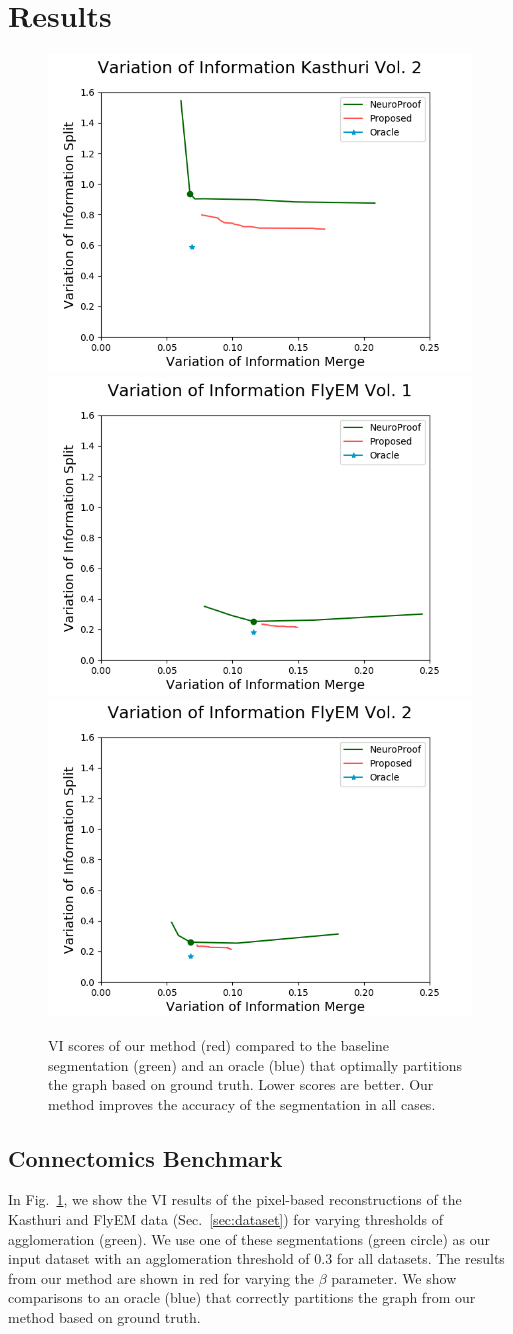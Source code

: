 \section{Results}

\begin{figure}[t!]
	\centering
	\includegraphics[width=0.32\linewidth]{./figures/variation_of_information-microns-test-600.png}
	\includegraphics[width=0.32\linewidth]{./figures/variation_of_information-FlyEM-train-600.png}
	\includegraphics[width=0.32\linewidth]{./figures/variation_of_information-FlyEM-test-600.png}
	\caption{VI scores of our method (red) compared to the baseline segmentation (green) and an oracle (blue) that optimally partitions the graph based on ground truth. Lower scores are better. Our method improves the accuracy of the segmentation in all cases.}
	\label{fig:variation-of-information}
\end{figure}

\subsection{Connectomics Benchmark}

In Fig.~\ref{fig:variation-of-information}, we show the VI results of the pixel-based reconstructions of the Kasthuri and FlyEM data (Sec.~\ref{sec:dataset}) for varying thresholds of agglomeration (green). 
We use one of these segmentations (green circle) as our input dataset with an agglomeration threshold of 0.3 for all datasets. 
The results from our method are shown in red for varying the $\beta$ parameter. 
We show comparisons to an oracle (blue) that correctly partitions the graph from our method based on ground truth.

